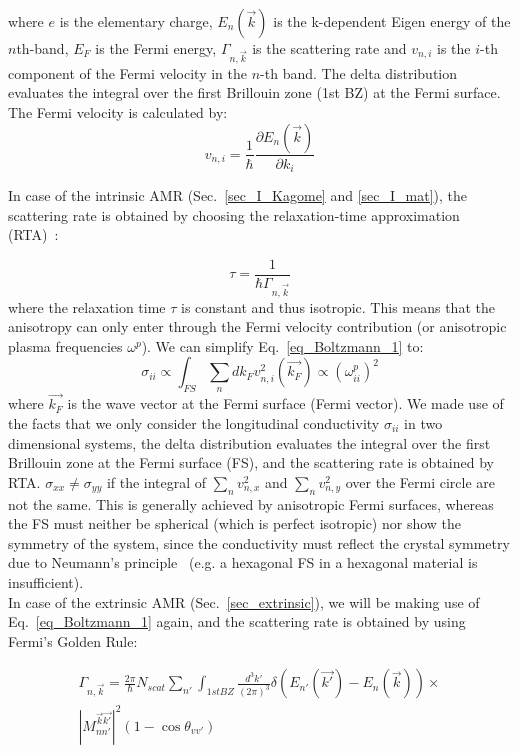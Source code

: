 \documentclass[prb,showpacs,amsmath,amssymb,superscriptaddress,twocolumn,floatfix]{revtex4-1}
\begin{document}
where $e$ is the elementary charge, $E_n(\vec{k})$ is the k-dependent Eigen energy of the $n$th-band, $E_F$ is the Fermi energy, $\Gamma_{n, \vec{k}}$ is the scattering rate and $v_{n,i}$ is the $i$-th component of the Fermi velocity in the $n$-th band. The delta distribution evaluates the integral over the first Brillouin zone (1st BZ) at the Fermi surface. The Fermi velocity is calculated by:
%
\begin{equation}
	v_{n, i} = \frac{1}{\hbar} \frac{\partial E_n(\vec{k})}{\partial k_i}
\end{equation}
%
{\color{blue} In case of the intrinsic AMR (Sec.~\ref{sec_I_Kagome} and \ref{sec_I_mat}), the scattering rate is obtained by choosing the relaxation-time approximation (RTA)~\cite{Vyborny:2009_a}:
	
\begin{equation}
	\tau = \frac{1}{\hbar \Gamma_{n, \vec{k}}}
\end{equation}
where the relaxation time $\tau$ is constant and thus isotropic. This means that the anisotropy can only enter through the Fermi velocity contribution (or anisotropic plasma frequencies $\omega^p$). 
We can simplify Eq.~\ref{eq_Boltzmann_1} to:
%
\begin{equation}
	\sigma_{ii} \propto \int_ {FS} \sum_n   dk_F  v^2_{n,i}(\vec{k_F})
	\propto (\omega_{ii}^p)^2
	\label{eq_Boltzmann_2}
\end{equation}
%
where $\vec{k_F}$ is the wave vector at the Fermi surface (Fermi
vector).
We made use of the facts that we only consider the
longitudinal conductivity $\sigma_{ii}$ in two dimensional systems,
the delta distribution evaluates the integral over the first Brillouin
zone at the Fermi surface (FS), and the scattering rate is obtained by
RTA. $\sigma_{xx} \neq \sigma_{yy}$ if the integral of $\sum_n
v^2_{n,x}$ and $\sum_n v^2_{n,y}$ over the Fermi circle are not the
same. This is generally achieved by anisotropic Fermi surfaces,
whereas the FS must neither be spherical (which is perfect isotropic)
nor show the symmetry of the system, since the conductivity must
reflect the crystal symmetry due to Neumann's
principle~\cite{Ritzinger:2021} (e.g. a hexagonal FS in a hexagonal
material is insufficient). \\


In case of the extrinsic AMR (Sec.~\ref{sec_extrinsic}), we will be making use of Eq.~\ref{eq_Boltzmann_1} again, and the scattering rate is obtained by using Fermi's Golden Rule:}
%
\begin{multline}
	\Gamma_{n, \vec{k}} = \frac{2 \pi}{\hbar} N_{scat} \sum_{n'}  \int_ {1st BZ} \frac{d^3k'}{(2\pi)^3} \delta(E_{n'}(\vec{k'}) - E_n(\vec{k})) \times \\ |M^{\vec{k}\vec{k'}}_{nn'} |^2 (1 - \cos \theta_{vv'})
	\label{eq_FermiGoldenRule_1}
\end{multline}
\end{document}
